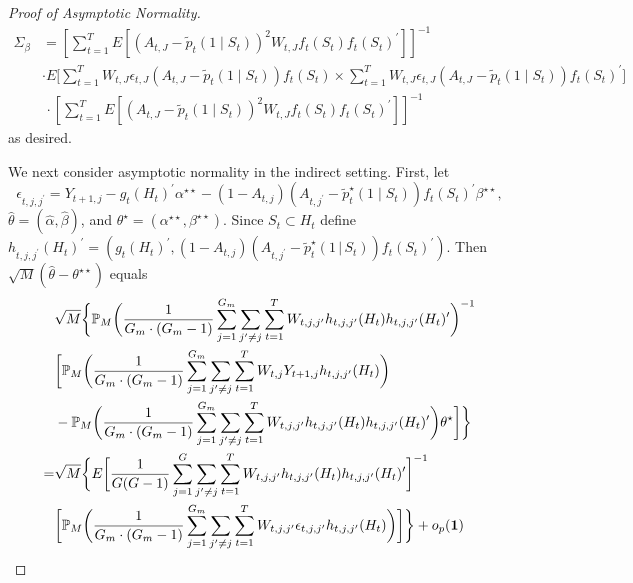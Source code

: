 \documentclass[12pt]{article}
\def\given{\, | \,}
\begin{document}
\begin{proof}[Proof of Asymptotic Normality]
\begin{align*}
 \Sigma_{\beta} &=  \left[ \sum_{t=1}^T E[ (A_{t,J} - \tilde{p}_t (1 \mid S_t)
                  )^2 W_{t,J} f_t (S_t) f_t (S_t)^\prime ] \right]^{-1} \\
  &\cdot E \bigg[ \sum_{t=1}^T W_{t,J} \epsilon_{t,J}
                  (A_{t,J} - \tilde{p}_t( 1 \mid S_t)) f_t(S_t)
          \times  \sum_{t=1}^T W_{t,J} \epsilon_{t,J}
                  (A_{t,J} - \tilde{p}_t( 1 \mid S_t)) f_t(S_t)^\prime
                  \bigg] \\
 &\, \cdot \left[ \sum_{t=1}^T E[ (A_{t,J} - \tilde{p}_t (1 \mid S_t)
                  )^2 W_{t,J} f_t (S_t) f_t (S_t)^\prime ] \right]^{-1}
\end{align*}
as desired.

We next consider asymptotic normality in the indirect setting.  First, let
\[
\epsilon_{t,j,j^\prime} = Y_{t+1,j} - g_t(H_t)^{\prime} \alpha^{\star \star} - (1 - A_{t,j})(A_{t,j^\prime}-\tilde{p}^\star_t(1 \mid S_t)) f_t(S_t)^{\prime} \beta^{\star \star},
\]
$\hat{\theta} = (\hat{\alpha}, \hat{\beta})$, and $\theta^\star = (\alpha^{\star \star}, \beta^{\star \star})$.
Since $S_t \subset H_t$ define $h_{t,j,j^\prime}(H_t)^\prime = (g_t(H_t)^\prime, (1-A_{t,j}) (A_{t,j^\prime}-\tilde{p}^\star_t(1 \given S_t)) f_t(S_t)^\prime)$. Then $\sqrt{M} ( \hat{\theta} - \theta^{\star \star} )$ equals
\begin{align*}
  &\sqrt{M} \bigg \{ \mathbb{P}_M \bigg( \frac{1}{G_m \cdot (G_m-1)} \sum_{j=1}^{G_m} \sum_{j^\prime \neq j} \sum_{t=1}^T W_{t,j,j^\prime} h_{t,j,j^\prime}(H_t) h_{t,j,j^\prime}(H_t)^\prime \bigg)^{-1} \\
  &\bigg[
    \mathbb{P}_M \bigg( \frac{1}{G_m \cdot (G_m - 1)} \sum_{j=1}^{G_m} \sum_{j^\prime \neq j} \sum_{t=1}^T W_{t,j} Y_{t+1,j} h_{t,j,j^\prime}(H_t) \bigg)  \\
  &- \mathbb{P}_M \bigg( \frac{1}{G_m \cdot (G_m - 1)} \sum_{j=1}^{G_m}\sum_{j^\prime \neq j}
  \sum_{t=1}^T W_{t,j,j^\prime} h_{t,j, j^\prime}(H_t) h_{t,j, j^\prime}(H_t)^\prime \bigg)
    \theta^\star \bigg] \bigg \} \\
  = &\sqrt{M} \bigg \{ E \bigg[
  \frac{1}{G (G-1)} \sum_{j=1}^G \sum_{j^\prime \neq j} \sum_{t=1}^T W_{t,j,j^\prime} h_{t,j, j^\prime}(H_t) h_{t,j, j^\prime}(H_t)^\prime \bigg]^{-1} \\
  &\bigg[ \mathbb{P}_M \bigg( \frac{1}{G_m \cdot (G_m-1)} \sum_{j=1}^{G_m} \sum_{j^\prime \neq j} \sum_{t=1}^T W_{t,j,j^\prime} \epsilon_{t,j, j^\prime} h_{t,j,j^\prime}(H_t) \bigg) \bigg] \bigg \} + o_p ( {\bf 1} )

\end{align*}
\end{proof}
\end{document}
